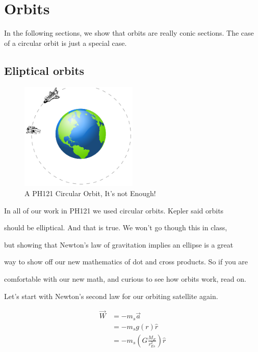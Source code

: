 \chapter{Orbits}
In the following sections, we show that orbits are really conic sections. The case of a circular orbit is just a special case.
\section{Eliptical orbits}


\begin{figure}[h]
	\begin{center}
	\includegraphics[width=0.5\textwidth]{orbit_figure}	
	\caption{A PH121 Circular Orbit, It's not Enough!}
\end{center}
\end{figure}


In all of our work in PH121 we used circular orbits. Kepler said orbits

should be elliptical. And that is true. We won't go though this in class,

but showing that Newton's law of gravitation implies an ellipse is a great

way to show off our new mathematics of dot and cross products. So if you are

comfortable with our new math, and curious to see how orbits work, read on.


Let's start with Newton's second law for our orbiting satellite again.

\begin{align*}
\overrightarrow{W}&=-m_{s}\overrightarrow{a}\\
&=-m_{s}g\left( r\right) \hat{r}\\
&=-m_{s}\left( G\frac{M_{E}}{r_{Es}^{2}}\right) \hat{r}
\end{align*}




